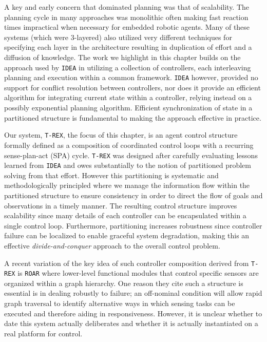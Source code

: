 A key and early concern that dominated planning was that of
scalability.  The planning cycle in many approaches was monolithic
often making fast reaction times impractical when necessary for
embedded robotic agents. Many of these systems (which were
$3$-layered) also utilized very different techniques for specifying
each layer in the architecture resulting in duplication of effort and
a diffusion of knowledge.  The work we highlight in this chapter
builds on the approach used by \texttt{IDEA} \cite{mus02, mus04} in
utilizing a collection of controllers, each interleaving planning and
execution within a common framework. \texttt{IDEA} however, provided
no support for conflict resolution between controllers, nor does it
provide an efficient algorithm for integrating current state within a
controller, relying instead on a possibly exponential planning
algorithm. Efficient synchronization of state in a partitioned
structure is fundamental to making the approach effective in practice.

Our system, \texttt{T-REX}, the focus of this chapter, is an agent
control structure formally defined as a composition of coordinated
control loops with a recurring sense-plan-act (SPA)
cycle. \texttt{T-REX} was designed after carefully evaluating lessons
learned from \texttt{IDEA} and owes substantially to the notion of
partitioned problem solving from that effort. However this
partitioning is systematic and methodologically principled where we
manage the information flow within the partitioned structure to ensure
consistency in order to direct the flow of goals and observations in a
timely manner. The resulting control structure improves scalability
since many details of each controller can be encapsulated within a
single control loop.  Furthermore, partitioning increases robustness
since controller failure can be localized to enable graceful system
degradation, making this an effective \emph{divide-and-conquer}
approach to the overall control problem.

A recent variation of the key idea of such controller composition
derived from \texttt{T-REX} is \texttt{ROAR} \cite{degroote11} where
lower-level functional modules that control specific sensors are
organized within a graph hierarchy. One reason they cite such a
structure is essential is in dealing robustly to failure; an
off-nominal condition will allow rapid graph traversal to identify
alternative ways in which sensing tasks can be executed and therefore
aiding in responsiveness. However, it is unclear whether to date this
system actually deliberates and whether it is actually instantiated on
a real platform for control.

